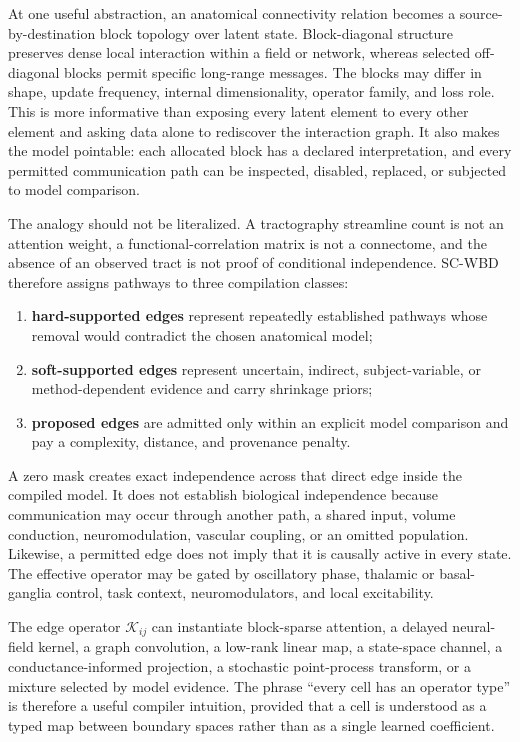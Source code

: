 At one useful abstraction, an anatomical connectivity relation becomes a
source-by-destination block topology over latent state. Block-diagonal
structure preserves dense local interaction within a field or network,
whereas selected off-diagonal blocks permit specific long-range messages.
The blocks may differ in shape, update frequency, internal dimensionality,
operator family, and loss role. This is more informative than exposing every
latent element to every other element and asking data alone to rediscover the
interaction graph. It also makes the model pointable: each allocated block has
a declared interpretation, and every permitted communication path can be
inspected, disabled, replaced, or subjected to model comparison.

The analogy should not be literalized. A tractography streamline count is not
an attention weight, a functional-correlation matrix is not a connectome, and
the absence of an observed tract is not proof of conditional independence.
SC-WBD therefore assigns pathways to three compilation classes:

\begin{enumerate}
\item \textbf{hard-supported edges} represent repeatedly established
  pathways whose removal would contradict the chosen anatomical model;
\item \textbf{soft-supported edges} represent uncertain, indirect,
  subject-variable, or method-dependent evidence and carry shrinkage priors;
\item \textbf{proposed edges} are admitted only within an explicit model
  comparison and pay a complexity, distance, and provenance penalty.
\end{enumerate}

A zero mask creates exact independence across that direct edge inside the
compiled model. It does not establish biological independence because
communication may occur through another path, a shared input, volume
conduction, neuromodulation, vascular coupling, or an omitted population.
Likewise, a permitted edge does not imply that it is causally active in every
state. The effective operator may be gated by oscillatory phase, thalamic or
basal-ganglia control, task context, neuromodulators, and local excitability.

The edge operator \(\mathcal{K}_{ij}\) can instantiate block-sparse attention,
a delayed neural-field kernel, a graph convolution, a low-rank linear map, a
state-space channel, a conductance-informed projection, a stochastic
point-process transform, or a mixture selected by model evidence. The phrase
“every cell has an operator type” is therefore a useful compiler intuition,
provided that a cell is understood as a typed map between boundary spaces
rather than as a single learned coefficient.

